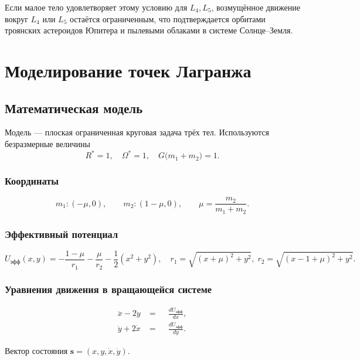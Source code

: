 \documentclass[12pt]{article}
\begin{document}
Если малое тело удовлетворяет этому условию для $L_4,L_5$, возмущённое движение вокруг $L_4$ или $L_5$ остаётся ограниченным, что подтверждается орбитами троянских астероидов Юпитера и пылевыми облаками в системе Солнце–Земля.

\section{Моделирование точек Лагранжа}\label{sec:model}

\subsection{Математическая модель}

Модель --- плоская ограниченная круговая задача трёх тел.
Используются безразмерные величины
\[
R^{*}=1,\quad \Omega^{*}=1,\quad G\bigl(m_1+m_2\bigr)=1 .
\]

\subsubsection{Координаты}

\[
m_1 : (-\mu,0),\qquad
m_2 : (1-\mu,0),\qquad
\mu=\frac{m_2}{m_1+m_2}.
\]

\subsubsection{Эффективный потенциал}

\[
U_{\mathrm{эфф}}(x,y)=
-\frac{1-\mu}{r_1}-\frac{\mu}{r_2}-\frac12(x^2+y^2),
\quad
r_1=\sqrt{(x+\mu)^2+y^2},\;
r_2=\sqrt{(x-1+\mu)^2+y^2}.
\]

\subsubsection{Уравнения движения в вращающейся системе}

\[
\begin{aligned}
\ddot x - 2\dot y &= \phantom{-}\frac{dU_{\text{эфф}}}{dx},\\
\ddot y + 2\dot x &= \phantom{-}\frac{dU_{\text{эфф}}}{dy}.
\end{aligned}
\]

Вектор состояния
\(\mathbf s=(x,y,\dot x,\dot y)\).
\end{document}
